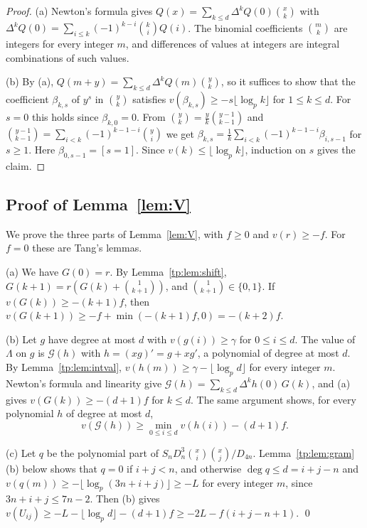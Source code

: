 \documentclass[11pt]{amsart}
\theoremstyle{definition}
\theoremstyle{remark}
\numberwithin{equation}{section}
\begin{document}
\begin{proof}
(a) Newton's formula gives $Q(x)=\sum_{k\le d}\Delta^kQ(0)\binom xk$ with
$\Delta^kQ(0)=\sum_{i\le k}(-1)^{k-i}\binom kiQ(i)$. The binomial coefficients $\binom mk$ are integers for every integer
$m$, and differences of values at integers are integral combinations of such values.

(b) By (a), $Q(m+y)=\sum_{k\le d}\Delta^kQ(m)\binom yk$, so it suffices to show that the coefficient $\beta_{k,s}$ of
$y^s$ in $\binom yk$ satisfies $v(\beta_{k,s})\ge-s\lfloor\log_pk\rfloor$ for $1\le k\le d$. For $s=0$ this holds since
$\beta_{k,0}=0$. From $\binom yk=\frac yk\binom{y-1}{k-1}$ and $\binom{y-1}{k-1}=\sum_{i<k}(-1)^{k-1-i}\binom yi$ we get
$\beta_{k,s}=\frac1k\sum_{i<k}(-1)^{k-1-i}\beta_{i,s-1}$ for $s\ge1$. Here $\beta_{0,s-1}=[s=1]$. Since
$v(k)\le\lfloor\log_pk\rfloor$, induction on $s$ gives the claim.
\end{proof}

\subsection{Proof of Lemma~\ref{lem:V}}\label{tp:ssec:V}
We prove the three parts of Lemma~\ref{lem:V}, with $f\ge0$ and $v(r)\ge-f$. For $f=0$ these are Tang's lemmas.

(a) We have $G(0)=r$. By Lemma~\ref{tp:lem:shift}, $G(k+1)=r(G(k)+\binom1{k+1})$, and $\binom1{k+1}\in\{0,1\}$. If
$v(G(k))\ge-(k+1)f$, then $v(G(k+1))\ge-f+\min(-(k+1)f,0)=-(k+2)f$.

(b) Let $g$ have degree at most $d$ with $v(g(i))\ge\gamma$ for $0\le i\le d$. The value of $\Lambda$ on $g$ is
$\mathcal G(h)$ with $h=(xg)'=g+xg'$, a polynomial of degree at most $d$. By Lemma~\ref{tp:lem:intval},
$v(h(m))\ge\gamma-\lfloor\log_pd\rfloor$ for every integer $m$. Newton's formula and linearity give
$\mathcal G(h)=\sum_{k\le d}\Delta^kh(0)\,G(k)$, and (a) gives $v(G(k))\ge-(d+1)f$ for $k\le d$. The same argument
shows, for every polynomial $h$ of degree at most $d$,
\begin{equation}\label{tp:eq:Gbound}
 v(\mathcal G(h))\ge\min_{0\le i\le d}v(h(i))-(d+1)f .
\end{equation}

(c) Let $q$ be the polynomial part of $S_nD_n^3\binom xi\binom xj/D_{4n}$. Lemma~\ref{tp:lem:gram}(b) below shows
that $q=0$ if $i+j<n$, and otherwise $\deg q\le d=i+j-n$ and $v(q(m))\ge-\lfloor\log_p(3n+i+j)\rfloor\ge-L$ for every
integer $m$, since $3n+i+j\le7n-2$. Then (b) gives $v(U_{ij})\ge-L-\lfloor\log_pd\rfloor-(d+1)f\ge-2L-f(i+j-n+1)$.
\qed
\end{document}
